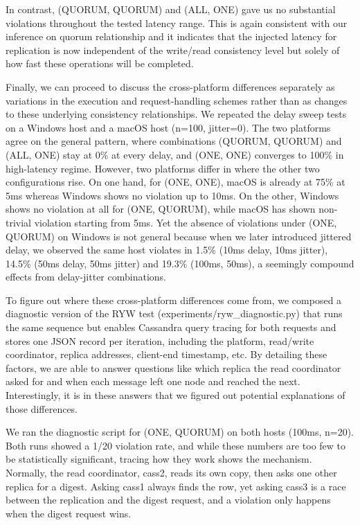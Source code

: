 In contrast, (QUORUM, QUORUM) and (ALL, ONE) gave us no substantial violations throughout the tested latency range. This is again consistent with our inference on quorum relationship and it indicates that the injected latency for replication is now independent of the write/read consistency level but solely of how fast these operations will be completed.

Finally, we can proceed to discuss the cross-platform differences separately as variations in the execution and request-handling schemes rather than as changes to these underlying consistency relationships. We repeated the delay sweep tests on a Windows host and a macOS host (n=100, jitter=0). The two platforms agree on the general pattern, where combinations (QUORUM, QUORUM) and (ALL, ONE) stay at 0\% at every delay, and (ONE, ONE) converges to 100\% in high-latency regime. However, two platforms differ in where the other two configurations rise. On one hand, for (ONE, ONE), macOS is already at 75\% at 5ms whereas Windows shows no violation up to 10ms. On the other, Windows shows no violation at all for (ONE, QUORUM), while macOS has shown non-trivial violation starting from 5ms. Yet the absence of violations under (ONE, QUORUM) on Windows is not general because when we later introduced jittered delay, we observed the same host violates in 1.5\% (10ms delay, 10ms jitter), 14.5\% (50ms delay, 50ms jitter) and 19.3\% (100ms, 50ms), a seemingly compound effects from delay-jitter combinations.

To figure out where these cross-platform differences come from, we composed a diagnostic version of the RYW test (experiments/ryw\_diagnostic.py) that runs the same sequence but enables Cassandra query tracing for both requests and stores one JSON record per iteration, including the platform, read/write coordinator, replica addresses, client-end timestamp, etc. By detailing these factors, we are able to answer questions like which replica the read coordinator asked for and when each message left one node and reached the next. Interestingly, it is in these answers that we figured out potential explanations of those differences.

We ran the diagnostic script for (ONE, QUORUM) on both hosts (100ms, n=20). Both runs showed a 1/20 violation rate, and while these numbers are too few to be statistically significant, tracing how they work shows the mechanism. Normally, the read coordinator, cass2, reads its own copy, then asks one other replica for a digest. Asking cass1 always finds the row, yet asking cass3 is a race between the replication and the digest request, and a violation only happens when the digest request wins.

